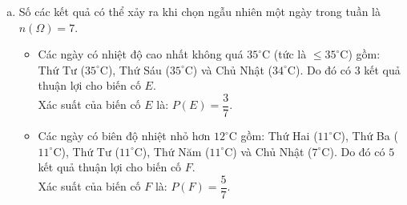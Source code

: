 \begin{bt}
{\begin{enumerate}[a)]
\begin{itemize}
		\item Thứ Sáu và Thứ Bảy đều có biên độ nhiệt lớn nhất là $13^\circ\text{C}$ ($35 - 22 = 13$ và $36 - 23 = 13$).
		\item Chủ Nhật có biên độ nhiệt là $7^\circ\text{C}$.
	\end{itemize}
	Vậy ngày có biên độ nhiệt lớn nhất trong tuần là Thứ Sáu và Thứ Bảy (đều đạt $13^\circ\text{C}$).
	\item Số các kết quả có thể xảy ra khi chọn ngẫu nhiên một ngày trong tuần là $n(\Omega) = 7$.
	\begin{itemize}
		\item Các ngày có nhiệt độ cao nhất không quá $35^\circ\text{C}$ (tức là $\le 35^\circ\text{C}$) gồm: Thứ Tư ($35^\circ\text{C}$), Thứ Sáu ($35^\circ\text{C}$) và Chủ Nhật ($34^\circ\text{C}$). Do đó có $3$ kết quả thuận lợi cho biến cố $E$.\\
		Xác suất của biến cố $E$ là: $P(E) = \dfrac{3}{7}$.
		\item Các ngày có biên độ nhiệt nhỏ hơn $12^\circ\text{C}$ gồm: Thứ Hai ($11^\circ\text{C}$), Thứ Ba ($11^\circ\text{C}$), Thứ Tư ($11^\circ\text{C}$), Thứ Năm ($11^\circ\text{C}$) và Chủ Nhật ($7^\circ\text{C}$). Do đó có $5$ kết quả thuận lợi cho biến cố $F$.\\
		Xác suất của biến cố $F$ là: $P(F) = \dfrac{5}{7}$.
	\end{itemize}
\end{enumerate}
}
\end{bt}

